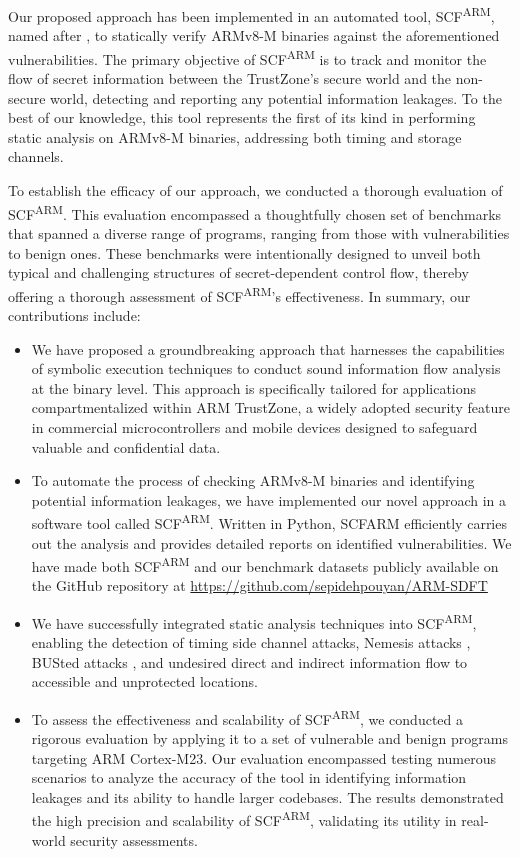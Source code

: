 Our proposed approach has been implemented in an automated tool,
\ac{SCF}\textsuperscript{ARM}, named after \cite{scfmsp}, to statically
verify ARMv8-M binaries against the aforementioned vulnerabilities. The
primary objective of \ac{SCF}\textsuperscript{ARM} is to track and monitor the flow of secret information between the TrustZone's secure world and the non-secure world, detecting and reporting any potential information leakages. To the best of our knowledge, this tool represents the first of its kind in performing static analysis on ARMv8-M binaries, addressing both timing and storage channels. 

To establish the efficacy of our approach, we conducted a thorough
evaluation of \ac{SCF}\textsuperscript{ARM}. This evaluation encompassed a
thoughtfully chosen set of benchmarks that spanned a diverse range of
programs, ranging from those with vulnerabilities to benign ones. These
benchmarks were intentionally designed to unveil both typical and
challenging structures of secret-dependent control flow, thereby offering a
thorough assessment of \ac{SCF}\textsuperscript{ARM}'s effectiveness. In summary, our contributions include:

\begin{itemize}
%
  \item{We have proposed a groundbreaking approach that harnesses the
capabilities of symbolic execution techniques to conduct sound information
flow analysis at the binary level. This approach is specifically tailored
for applications compartmentalized within ARM TrustZone, a widely adopted
security feature in commercial microcontrollers and mobile devices designed
to safeguard valuable and confidential data.}
%
  \item{To automate the process of checking ARMv8-M binaries and
identifying potential information leakages, we have implemented our novel
approach in a software tool called \ac{SCF}\textsuperscript{ARM}. Written
in Python, SCFARM efficiently carries out the analysis and provides
detailed reports on identified vulnerabilities. We have made both
\ac{SCF}\textsuperscript{ARM} and our benchmark datasets publicly available
on the GitHub repository at
\href{https://github.com/sepidehpouyan/ARM-SDFT}{https://github.com/sepidehpouyan/ARM-SDFT}}
%
  \item{We have successfully integrated static analysis techniques into
\ac{SCF}\textsuperscript{ARM}, enabling the detection of timing side
channel attacks, Nemesis attacks \cite{Nemesis}, BUSted attacks
\cite{busted}, and undesired direct and indirect information flow to
accessible and unprotected locations.}
%
  \item{To assess the effectiveness and scalability of
\ac{SCF}\textsuperscript{ARM}, we conducted a rigorous evaluation by
applying it to a set of vulnerable and benign programs targeting ARM
Cortex-M23. Our evaluation encompassed testing numerous scenarios to
analyze the accuracy of the tool in identifying information leakages and
its ability to handle larger codebases. The results demonstrated the high
precision and scalability of \ac{SCF}\textsuperscript{ARM}, validating its
utility in real-world security assessments.}
%
\end{itemize}

